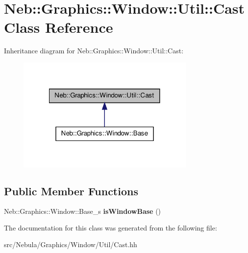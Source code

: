 \hypertarget{classNeb_1_1Graphics_1_1Window_1_1Util_1_1Cast}{\section{\-Neb\-:\-:\-Graphics\-:\-:\-Window\-:\-:\-Util\-:\-:\-Cast \-Class \-Reference}
\label{classNeb_1_1Graphics_1_1Window_1_1Util_1_1Cast}
}


\-Inheritance diagram for \-Neb\-:\-:\-Graphics\-:\-:\-Window\-:\-:\-Util\-:\-:\-Cast\-:\nopagebreak
\begin{figure}[H]
\begin{center}
\leavevmode
\includegraphics[width=248pt]{classNeb_1_1Graphics_1_1Window_1_1Util_1_1Cast__inherit__graph}
\end{center}
\end{figure}
\subsection*{\-Public \-Member \-Functions}
\begin{DoxyCompactItemize}
\item 
\hypertarget{classNeb_1_1Graphics_1_1Window_1_1Util_1_1Cast_ae412c7245b8241e696fa359176970f69}{\-Neb\-::\-Graphics\-::\-Window\-::\-Base\-\_\-s {\bfseries is\-Window\-Base} ()}\label{classNeb_1_1Graphics_1_1Window_1_1Util_1_1Cast_ae412c7245b8241e696fa359176970f69}

\end{DoxyCompactItemize}


\-The documentation for this class was generated from the following file\-:\begin{DoxyCompactItemize}
\item 
src/\-Nebula/\-Graphics/\-Window/\-Util/\-Cast.\-hh\end{DoxyCompactItemize}
